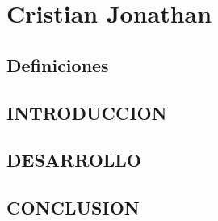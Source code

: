 \section{Cristian Jonathan}
\subsection{Definiciones}
\subsection{INTRODUCCION}
\subsection{DESARROLLO}
\subsection{CONCLUSION}
